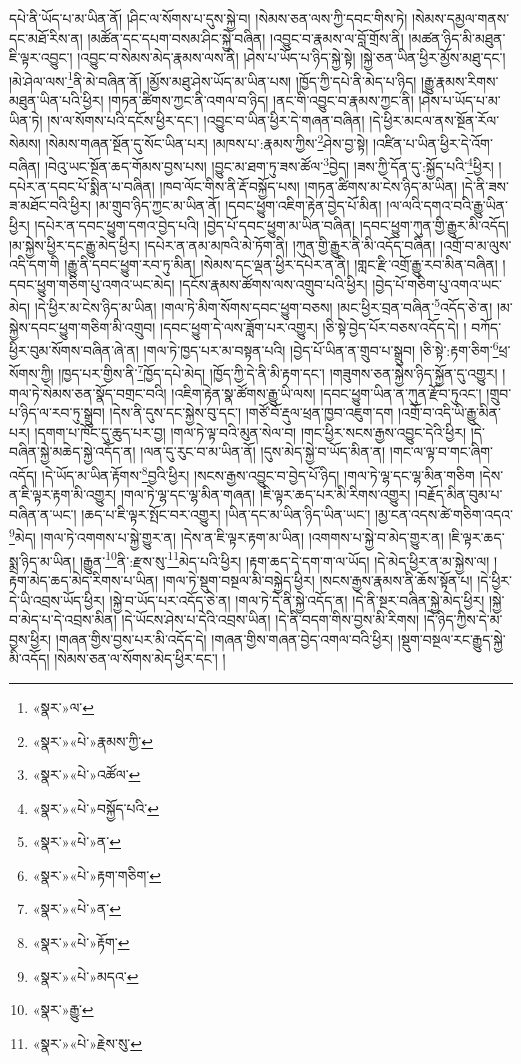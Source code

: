 དཔེ་ནི་ཡོད་པ་མ་ཡིན་ནོ། །ཤིང་ལ་སོགས་པ་དུས་སྐྱེ་བ། །སེམས་ཅན་ལས་ཀྱི་དབང་གིས་ཏེ། །སེམས་དམྱལ་གནས་དང་མཐོ་རིས་ན། །མཚོན་དང་དཔག་བསམ་ཤིང་སྐྱེ་བཞིན། །འབྱུང་བ་རྣམས་ལ་བློ་གྲོས་ནི། །མཚན་ཉིད་མི་མཐུན་ཇི་ལྟར་འབྱུང་། །འབྱུང་བ་སེམས་མེད་རྣམས་ལས་ནི། །ཤེས་པ་ཡོད་པ་ཉིད་སྐྱེ་སྟེ། །སྐྱེ་ཅན་ཡིན་ཕྱིར་མྱོས་མཐུ་དང་། །མེ་ཤེལ་ལས་\footnote{«སྣར་»ལ་}ནི་མེ་བཞིན་ནོ། །མྱོས་མཐུ་ཤེས་ཡོད་མ་ཡིན་པས། །ཁྱོད་ཀྱི་དཔེ་ནི་མེད་པ་ཉིད། །རྒྱུ་རྣམས་རིགས་མཐུན་ཡིན་པའི་ཕྱིར། །གཏན་ཚིགས་ཀྱང་ནི་འགལ་བ་ཉིད། །ནང་གི་འབྱུང་བ་རྣམས་ཀྱང་ནི། །ཤེས་པ་ཡོད་པ་མ་ཡིན་ཏེ། །ས་ལ་སོགས་པའི་དངོས་ཕྱིར་དང་། །འབྱུང་བ་ཡིན་ཕྱིར་དེ་གཞན་བཞིན། །དེ་ཕྱིར་མངལ་ནས་སྔོན་རོལ་སེམས། །སེམས་གཞན་སྔོན་དུ་སོང་ཡིན་པར། །མཁས་པ་:རྣམས་ཀྱིས་\footnote{«སྣར་»«པེ་»རྣམས་ཀྱི་}ཤེས་བྱ་སྟེ། །འཛིན་པ་ཡིན་ཕྱིར་དེ་འོག་བཞིན། །བེའུ་ཡང་སྔོན་ཆད་གོམས་བྱས་པས། །བྱུང་མ་ཐག་ཏུ་ཟས་ཚོལ་\footnote{«སྣར་»«པེ་»འཚོལ་}བྱེད། །ཟས་ཀྱི་དོན་དུ་:སྐྱོད་པའི་\footnote{«སྣར་»«པེ་»བསྐྱོད་པའི་}ཕྱིར། །དཔེར་ན་དབང་པོ་སྨིན་པ་བཞིན། །ཁབ་ལོང་གིས་ནི་རྡོ་བསྐྱོད་པས། །གཏན་ཚིགས་མ་ངེས་ཉིད་མ་ཡིན། །དེ་ནི་ཟས་ཟ་མཐོང་བའི་ཕྱིར། །མ་གྲུབ་ཉིད་ཀྱང་མ་ཡིན་ནོ། །དབང་ཕྱུག་འཇིག་རྟེན་བྱེད་པོ་མིན། །ལ་ལའི་དགའ་བའི་རྒྱུ་ཡིན་ཕྱིར། །དཔེར་ན་དབང་ཕྱུག་དགའ་བྱེད་པའི། །བྱེད་པོ་དབང་ཕྱུག་མ་ཡིན་བཞིན། །དབང་ཕྱུག་ཀུན་གྱི་རྒྱུར་མི་འདོད། །མ་སྐྱེས་ཕྱིར་དང་རྒྱུ་མེད་ཕྱིར། །དཔེར་ན་ནམ་མཁའི་མེ་ཏོག་ནི། །ཀུན་གྱི་རྒྱུར་ནི་མི་འདོད་བཞིན། །འགྲོ་བ་མ་ལུས་འདི་དག་གི །རྒྱུ་ནི་དབང་ཕྱུག་རབ་ཏུ་མིན། །སེམས་དང་ལྡན་ཕྱིར་དཔེར་ན་ནི། །གླང་རྫི་འགྲོ་རྒྱུ་རབ་མིན་བཞིན། །དབང་ཕྱུག་གཅིག་པུ་འགའ་ཡང་མེད། །དངོས་རྣམས་ཚོགས་ལས་འགྲུབ་པའི་ཕྱིར། །བྱེད་པོ་གཅིག་པུ་འགའ་ཡང་མེད། །དེ་ཕྱིར་མ་ངེས་ཉིད་མ་ཡིན། །གལ་ཏེ་མིག་སོགས་དབང་ཕྱུག་བཅས། །མང་ཕྱིར་བྲན་བཞིན་\footnote{«སྣར་»«པེ་»ན་}འདོད་ཅེ་ན། །མ་སྐྱེས་དབང་ཕྱུག་གཅིག་མི་འགྲུབ། །དབང་ཕྱུག་དེ་ལས་ཟློག་པར་འགྱུར། །ཅི་སྟེ་བྱེད་པོར་བཅས་འདོད་དེ། །
བཀོད་ཕྱིར་བུམ་སོགས་བཞིན་ཞེ་ན། །གལ་ཏེ་ཁྱད་པར་མ་བསྟན་པའི། །བྱེད་པོ་ཡིན་ན་གྲུབ་པ་སྒྲུབ། །ཅི་སྟེ་:རྟག་ཅིག་\footnote{«སྣར་»«པེ་»རྟག་གཅིག་}ཕྲ་སོགས་ཀྱི། །ཁྱད་པར་གྱིས་ནི་\footnote{«སྣར་»«པེ་»ན་}ཁྱོད་དཔེ་མེད། །ཁྱོད་ཀྱི་དེ་ནི་མི་རྟག་དང་། །གཟུགས་ཅན་སྐྱེས་ཉིད་སྐྱོན་དུ་འགྱུར། །གལ་ཏེ་སེམས་ཅན་སྣོད་བགྲང་བའི། །འཇིག་རྟེན་སྣ་ཚོགས་རྒྱུ་ཡི་ལས། །དབང་ཕྱུག་ཡིན་ན་ཀུན་རྫོབ་ཏུའང་། །གྲུབ་པ་ཉིད་ལ་རབ་ཏུ་སྒྲུབ། །དེས་ནི་དུས་དང་སྐྱེས་བུ་དང་། །གཙོ་བོ་རྡུལ་ཕྲན་ཁྱབ་འཇུག་དག །འགྲོ་བ་འདི་ཡི་རྒྱུ་མིན་པར། །དགག་པ་ཁོང་དུ་ཆུད་པར་བྱ། །གལ་ཏེ་ལྟ་བའི་མུན་སེལ་བ། །གང་ཕྱིར་སངས་རྒྱས་འབྱུང་དེའི་ཕྱིར། །དེ་བཞིན་སྐྱེ་མཆེད་སྐྱེ་འདོད་ན། །ལན་དུ་རུང་བ་མ་ཡིན་ནོ། །དུས་མེད་སྐྱེ་བ་ཡོད་མིན་ན། །གང་ལ་ལྟ་བ་གང་ཞིག་འདོད། །དེ་ཡོད་མ་ཡིན་རྟོགས་\footnote{«སྣར་»«པེ་»རྟོག་}བྱའི་ཕྱིར། །སངས་རྒྱས་འབྱུང་བ་བྱེད་པོ་ཉིད། །གལ་ཏེ་ལྷ་དང་ལྷ་མིན་གཅིག །དེས་ན་ཇི་ལྟར་རྟག་མི་འགྱུར། །གལ་ཏེ་ལྷ་དང་ལྷ་མིན་གཞན། །ཇི་ལྟར་ཆད་པར་མི་རིགས་འགྱུར། །བརྗོད་མིན་བུམ་པ་བཞིན་ན་ཡང་། །ཆད་པ་ཇི་ལྟར་སྤོང་བར་འགྱུར། །ཡིན་དང་མ་ཡིན་ཉིད་ཡིན་ཡང་། །མྱ་ངན་འདས་ཚེ་གཅིག་འདའ་\footnote{«སྣར་»«པེ་»མདའ་}མེད། །གལ་ཏེ་འགགས་པ་སྐྱེ་གྱུར་ན། །དེས་ན་ཇི་ལྟར་རྟག་མ་ཡིན། །འགགས་པ་སྐྱེ་བ་མེད་གྱུར་ན། །ཇི་ལྟར་ཆད་སྨྲ་ཉིད་མ་ཡིན། །རྒྱུན་\footnote{«སྣར་»རྒྱུ་}ནི་:རྫས་སུ་\footnote{«སྣར་»«པེ་»རྗེས་སུ་}མེད་པའི་ཕྱིར། །རྟག་ཆད་དེ་དག་ག་ལ་ཡོད། །དེ་མེད་ཕྱིར་ན་མ་སྐྱེས་ལ། །རྟག་མེད་ཆད་མེད་རིགས་པ་ཡིན། །གལ་ཏེ་སྡུག་བསྔལ་མི་བསྐྱེད་ཕྱིར། །སངས་རྒྱས་རྣམས་ནི་ཆོས་སྟོན་པ། །དེ་ཕྱིར་དེ་ཡི་འབྲས་ཡོད་ཕྱིར། །སྐྱེ་བ་ཡོད་པར་འདོད་ཅེ་ན། །གལ་ཏེ་དེ་ནི་སྐྱེ་འདོད་ན། །དེ་ནི་སྔར་བཞིན་སྐྱེ་མེད་ཕྱིར། །སྐྱེ་བ་མེད་པ་དེ་འབྲས་མིན། །དེ་ཡོངས་ཤེས་པ་དེའི་འབྲས་ཡིན། །དེ་ནི་བདག་གིས་བྱས་མི་རིགས། །དེ་ཉིད་ཀྱིས་དེ་མ་བྱས་ཕྱིར། །གཞན་གྱིས་བྱས་པར་མི་འདོད་དེ། །གཞན་གྱིས་གཞན་བྱེད་འགལ་བའི་ཕྱིར། །སྡུག་བསྔལ་རང་རྒྱུད་སྐྱེ་མི་འདོད། །སེམས་ཅན་ལ་སོགས་མེད་ཕྱིར་དང་། །
